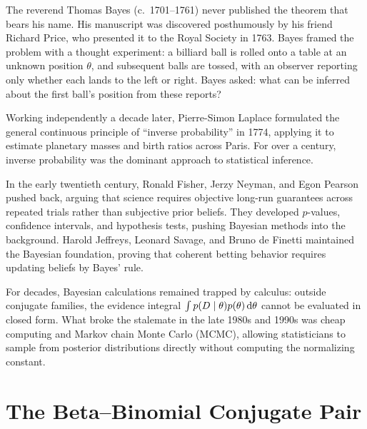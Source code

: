 \begin{historybox}
The reverend Thomas Bayes (c.\ 1701--1761) never published the theorem that bears
his name. His manuscript was discovered posthumously by his friend Richard Price,
who presented it to the Royal Society in 1763. Bayes framed the problem with a
thought experiment: a billiard ball is rolled onto a table at an unknown position
$\theta$, and subsequent balls are tossed, with an observer reporting only whether
each lands to the left or right. Bayes asked: what can be inferred about the first
ball's position from these reports?

Working independently a decade later, Pierre-Simon Laplace formulated the general
continuous principle of ``inverse probability'' in 1774, applying it to estimate
planetary masses and birth ratios across Paris. For over a century, inverse
probability was the dominant approach to statistical inference.

In the early twentieth century, Ronald Fisher, Jerzy Neyman, and Egon Pearson
pushed back, arguing that science requires objective long-run guarantees across
repeated trials rather than subjective prior beliefs. They developed $p$-values,
confidence intervals, and hypothesis tests, pushing Bayesian methods into the
background. Harold Jeffreys, Leonard Savage, and Bruno de Finetti maintained the
Bayesian foundation, proving that coherent betting behavior requires updating
beliefs by Bayes' rule.

For decades, Bayesian calculations remained trapped by calculus: outside conjugate
families, the evidence integral $\int p(D\mid\theta)p(\theta)\,\mathrm{d}\theta$ cannot
be evaluated in closed form. What broke the stalemate in the late 1980s and 1990s
was cheap computing and Markov chain Monte Carlo (MCMC), allowing statisticians
to sample from posterior distributions directly without computing the normalizing
constant.
\end{historybox}

\section{The Beta--Binomial Conjugate Pair}
\label{ch31:beta-binomial}

